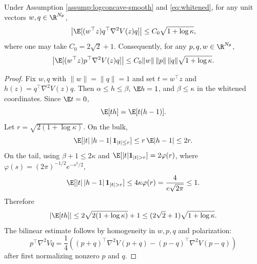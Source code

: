 \begin{lemma}\label{lem:rank-one-hermite}
    Under Assumption \ref{assump:logconcave-smooth} and \eqref{eq:whitened}, for any unit vectors $w,q\in\R^{N_\theta}$,
    \begin{equation*}
        \left|
        \E[(w^\top z)q^\top \nabla^2 V(z)q]
        \right|
        \leq
        C_0\sqrt{1+\log\kappa},
    \end{equation*}
    where one may take $C_0=2\sqrt{2}+1$. Consequently, for any $p,q,w\in\R^{N_\theta}$,
    \begin{equation*}
        \left|
        \E[(w^\top z)p^\top \nabla^2 V(z)q]
        \right|
        \leq
        C_0\|w\|\,\|p\|\,\|q\|\sqrt{1+\log\kappa}.
    \end{equation*}
\end{lemma}

\begin{proof}
    Fix $w,q$ with $\|w\|=\|q\|=1$ and set $t=w^\top z$ and $h(z)=q^\top\nabla^2V(z)q$. Then $\alpha\leq h\leq\beta$, $\E h=1$, and $\beta\leq\kappa$ in the whitened coordinates. Since $\E t=0$,
    \begin{equation*}
        \E[t h]=\E[t(h-1)].
    \end{equation*}
    Let $r=\sqrt{2(1+\log\kappa)}$. On the bulk,
    \begin{equation*}
        \E[|t|\,|h-1|\,\mathbf{1}_{|t|\leq r}]
        \leq
        r\,\E|h-1|
        \leq
        2r.
    \end{equation*}
    On the tail, using $\beta+1\leq 2\kappa$ and $\E[|t|\mathbf{1}_{|t|>r}]=2\varphi(r)$, where $\varphi(s)=(2\pi)^{-1/2}e^{-s^2/2}$,
    \begin{equation*}
        \E[|t|\,|h-1|\,\mathbf{1}_{|t|> r}]
        \leq
        4\kappa\varphi(r)
        =
        \frac{4}{e\sqrt{2\pi}}
        \leq
        1.
    \end{equation*}
    Therefore
    \begin{equation*}
        |\E[t h]|
        \leq
        2\sqrt{2(1+\log\kappa)}+1
        \leq
        (2\sqrt{2}+1)\sqrt{1+\log\kappa}.
    \end{equation*}
    The bilinear estimate follows by homogeneity in $w,p,q$ and polarization:
    \begin{equation*}
        p^\top\nabla^2Vq
        =
        \frac14\left((p+q)^\top\nabla^2V(p+q)-(p-q)^\top\nabla^2V(p-q)\right)
    \end{equation*}
    after first normalizing nonzero $p$ and $q$.
\end{proof}


